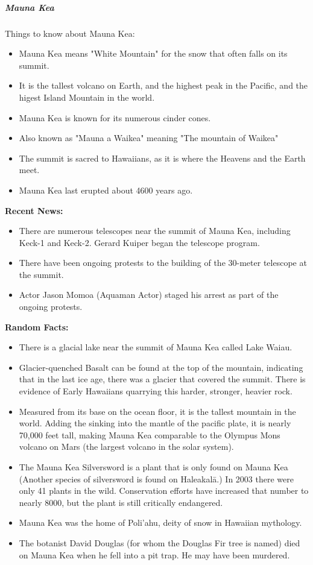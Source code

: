 \documentclass[12pt]{book}
\begin{document}
					\newpage
					\subparagraph{Mauna Kea}
						Things to know about Mauna Kea:
						\begin{itemize}
							\item Mauna Kea means "White Mountain" for the snow that often falls on its summit.
							\item It is the tallest volcano on Earth, and the highest peak in the Pacific, and the higest Island Mountain in the world.
							\item Mauna Kea is known for its numerous cinder cones.
							\item Also known as "Mauna a Waikea" meaning "The mountain of Waikea"
							\item The summit is sacred to Hawaiians, as it is where the Heavens and the Earth meet.
							\item Mauna Kea last erupted about 4600 years ago. 
	
							
						\end{itemize}
					\textbf{Recent News:}
							\begin{itemize}
								\item There are numerous telescopes near the summit of Mauna Kea, including Keck-1 and Keck-2.  Gerard Kuiper began the telescope program.  
								\item There have been ongoing protests to the building of the 30-meter telescope at the summit. 
								\item Actor Jason Momoa (Aquaman Actor) staged his arrest as part of the ongoing protests.
							\end{itemize}
					\textbf{Random Facts:}
							\begin{itemize}
								\item There is a glacial lake near the summit of Mauna Kea called Lake Waiau.
								\item Glacier-quenched Basalt can be found at the top of the mountain, indicating that in the last ice age, there was a glacier that covered the summit.  There is evidence of Early Hawaiians quarrying this harder, stronger, heavier rock. 
								\item Measured from its base on the ocean floor, it is the tallest mountain in the world.  Adding the sinking into the mantle of the pacific plate, it is nearly 70,000 feet tall, making Mauna Kea comparable to the Olympus Mons volcano on Mars (the largest volcano in the solar system).  
								\item The Mauna Kea Silversword is a plant that is only found on Mauna Kea (Another species of silversword is found on Haleakal\=a.)  In 2003 there were only 41 plants in the wild.  Conservation efforts have increased that number to nearly 8000, but the plant is still critically endangered. 
								\item Mauna Kea was the home of  Poli'ahu, deity of snow in Hawaiian mythology.
								\item The botanist David Douglas (for whom the Douglas Fir tree is named) died on Mauna Kea when he fell into a pit trap.  He may have been murdered.
								
								
							\end{itemize}
\end{document}
